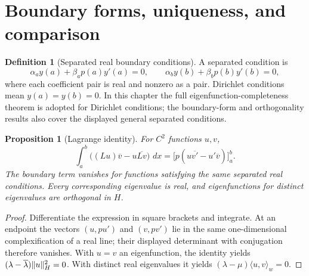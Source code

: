 \documentclass[11pt,oneside]{book}
\newtheorem{proposition}[theorem]{Proposition}
\theoremstyle{definition}
\newtheorem{definition}[theorem]{Definition}
\theoremstyle{remark}\newtheorem{remark}[theorem]{Remark}
\newcommand{\dd}{\,d}\newcommand{\id}{\operatorname{id}}
\begin{document}
\section{Boundary forms, uniqueness, and comparison}

\begin{definition}[Separated real boundary conditions]\label{d13:10:boundary}
A separated condition is
\[
 \alpha_a y(a)+\beta_a p(a)y'(a)=0,\qquad
 \alpha_b y(b)+\beta_b p(b)y'(b)=0 ,
\]
where each coefficient pair is real and nonzero as a pair.
Dirichlet conditions mean \(y(a)=y(b)=0\). In this chapter the full
eigenfunction-completeness theorem is adopted for Dirichlet conditions;
the boundary-form and orthogonality results also cover the displayed
general separated conditions.
\end{definition}

\begin{proposition}[Lagrange identity]\label{d13:10:lagrange}
For \(C^2\) functions \(u,v\),
\[
 \int_a^b\big((Lu)\overline v-u\overline{Lv}\big)\,\dd x
   =\big[p(u\overline{v'}-u'\overline v)\big]_a^b .
\]
The boundary term vanishes for functions satisfying the same separated
real conditions. Every corresponding eigenvalue is real, and eigenfunctions
for distinct eigenvalues are orthogonal in \(H\).
\end{proposition}
\begin{proof}
Differentiate the expression in square brackets and integrate. At an
endpoint the vectors \((u,pu')\) and \((v,pv')\) lie in the same
one-dimensional complexification of a real line; their displayed
determinant with conjugation therefore vanishes. With \(u=v\) an
eigenfunction, the identity yields
\((\lambda-\overline\lambda)\lVert u\rVert_H^2=0\). With distinct real eigenvalues
it yields \((\lambda-\mu)\langle u,v\rangle_w=0\).
\end{proof}
\end{document}
